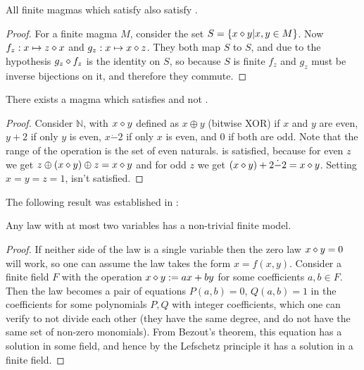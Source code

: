 \begin{theorem}\label{finite_imp_3994_3588_thm}
  \leanok
  All finite magmas which satisfy  also satisfy .
\end{theorem}

\begin{proof}\label{finite_imp_3994_3588} \leanok
  For a finite magma $M$, consider the set $S = \{x \diamond y | x, y \in M\}$.
  Now $f_z : x \mapsto z \diamond x$ and $g_z : x \mapsto x \diamond z$.
  They both map $S$ to $S$, and due to the hypothesis $g_z \diamond f_z$ is the identity on $S$,
  so because $S$ is finite $f_z$ and $g_z$ must be inverse bijections on it, and therefore
  they commute.
\end{proof}

\begin{theorem}\label{non_imp_3994_3588_thm}
  \leanok
  There exists a magma which satisfies  and not .
\end{theorem}

\begin{proof} \leanok
  Consider $\mathbb{N}$, with $x \diamond y$ defined as $x \oplus y$ (bitwise XOR) if $x$ and $y$ are even,
  $y+2$ if only $y$ is even, $x \dot - 2$ if only $x$ is even, and $0$ if both are odd.
  Note that the range of the operation is the set of even naturals.
   is satisfied, because for even $z$ we get $z \oplus (x \diamond y) \oplus z = x \diamond y$
  and for odd $z$ we get $(x \diamond y) + 2 \dot - 2 = x \diamond y$.
  Setting $x = y = z = 1$,  isn't satisfied.
\end{proof}

The following result was established in \cite{austin_finite}:

\begin{theorem}\label{austin-two} Any law with at most two variables has a non-trivial finite model.
\end{theorem}

\begin{proof}  If neither side of the law is a single variable then the zero law $x \diamond y = 0$ will work, so one can assume the law takes the form $x = f(x,y)$.  Consider a finite field $F$ with the operation $x \diamond y := ax+by$ for some coefficients $a,b \in F$.  Then the law becomes a pair of equations $P(a,b)=0$, $Q(a,b)=1$ in the coefficients for some polynomials $P,Q$ with integer coefficients, which one can verify to not divide each other (they have the same degree, and do not have the same set of non-zero monomials).  From Bezout's theorem, this equation has a solution in some field, and hence by the Lefschetz principle it has a solution in a finite field.
\end{proof}
